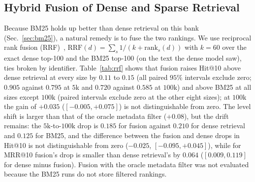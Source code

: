 \documentclass{ieeeaccess}
\makeatletter
\DeclareRobustCommand{\_}{\ifmmode\nfss@text{\textunderscore}\else\textunderscore\allowbreak\fi}
\makeatother
\begin{document}
\subsection{Hybrid Fusion of Dense and Sparse Retrieval}
\label{sec:rrf}
Because BM25 holds up better than dense retrieval on this bank (Sec.~\ref{sec:bm25}), a natural remedy is to fuse the two rankings. We use reciprocal rank fusion (RRF)~\cite{cormack2009rrf}, $\mathrm{RRF}(d)=\sum\nolimits_{s}1/(k+\mathrm{rank}_s(d))$ with $k{=}60$ over the exact dense top-100 and the BM25 top-100 (on the text the dense model saw), ties broken by identifier. Table~\ref{tab:rrf} shows that fusion raises Hit@10 above dense retrieval at every size by $0.11$ to $0.15$ (all paired $95\%$ intervals exclude zero; $0.905$ against $0.795$ at $5\text{k}$ and $0.720$ against $0.585$ at $100\text{k}$) and above BM25 at all sizes except $100\text{k}$ (paired intervals exclude zero at the other eight sizes); at $100\text{k}$ the gain of $+0.035$ ($[-0.005,+0.075]$) is not distinguishable from zero. The level shift is larger than that of the oracle metadata filter ($+0.08$), but the drift remains: the $5\text{k}$-to-$100\text{k}$ drop is $0.185$ for fusion against $0.210$ for dense retrieval and $0.125$ for BM25, and the difference between the fusion and dense drops in Hit@10 is not distinguishable from zero ($-0.025$, $[-0.095,+0.045]$), while for MRR@10 fusion's drop is smaller than dense retrieval's by $0.064$ ($[0.009,0.119]$ for dense minus fusion). Fusion with the oracle metadata filter was not evaluated because the BM25 runs do not store filtered rankings.
\end{document}
